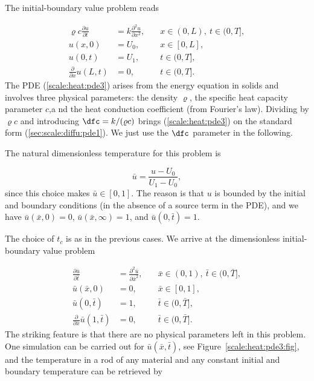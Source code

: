 \documentclass[graybox,envcountchap,sectrefs,final]{svmonodo}
\begin{document}
The initial-boundary value problem reads

\begin{align}
\varrho c \frac{\partial u}{\partial t} &=
k \frac{\partial^2 u}{\partial x^2},
\quad &  x\in (0,L),\ t\in (0, T],
\label{scale:heat:pde3}\\ 
u(x,0) &= U_0,
\quad & x\in [0,L],
\label{scale:heat:pde3:ic:u}\\ 
u(0, t) & = U_1,
\quad  & t\in (0, T],
\label{scale:heat:pde3:bc:0}\\ 
\frac{\partial}{\partial x} u(L, t) & = 0,
\quad & t\in (0, T].
\label{scale:heat:pde3:bc:L}
\end{align}
The PDE (\ref{scale:heat:pde3}) arises from the energy equation in
solids and involves three physical parameters: the density $\varrho$,
the specific heat capacity parameter $c$,a nd the heat conduction
coefficient (from Fourier's law). Dividing by $\varrho c$ and
introducing $\dfc = k/(\varrho c)$ brings (\ref{scale:heat:pde3}) on
the standard form (\ref{sec:scale:diffu:pde1}). We just use the
$\dfc$ parameter in the following.

The natural dimensionless temperature for this problem is

\[ \bar u = \frac{u - U_0}{U_1 - U_0},\]
since this choice makes $\bar u\in [0,1]$. The reason is that $u$ is bounded by
the initial and boundary conditions (in the absence of a source term in
the PDE),
and we have
$\bar u(\bar x,0)=0$, $\bar u(\bar x,\infty)=1$, and $
\bar u(0,\bar t)=1$.

The choice of $t_c$ is as in the previous cases. We arrive at
the dimensionless initial-boundary value problem

\begin{align}
\frac{\partial \bar u}{\partial \bar t} &=
\frac{\partial^2 \bar u}{\partial \bar x^2},
\quad &  \bar x\in (0,1),\ \bar t\in (0, \bar T],
\label{scale:heat:pde3:d}\\ 
\bar u(\bar x,0) &= 0,
\quad & \bar x\in [0,1],
\label{scale:heat:pde3:ic:u:d}\\ 
\bar u(0, \bar t) & = 1,
\quad  & \bar t\in (0, \bar T],
\label{scale:heat:pde3:bc:0:d}\\ 
\frac{\partial}{\partial \bar x} \bar u(1, \bar t) & = 0,
\quad & \bar t\in (0, \bar T].
\label{scale:heat:pde3:bc:L:d}
\end{align}
The striking feature is that there are no physical parameters left in
this problem. One simulation can be carried out for $\bar u(\bar x,\bar t)$,
see Figure~\ref{scale:heat:pde3:fig},
and the temperature in a rod of any material and any constant initial and
boundary temperature can be retrieved by
\end{document}
